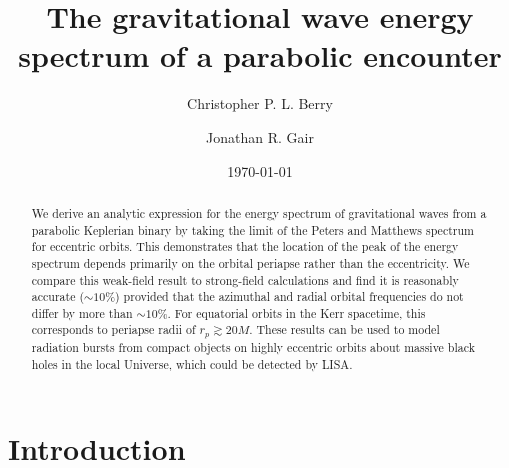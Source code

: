 \documentclass[aps,prd,amsfonts,amssymb,amsmath,nofootinbib,floatfix,reprint,showpacs,groupedaddress]{revtex4-1}
\begin{document}

\title{The gravitational wave energy spectrum of a parabolic encounter}

\author{Christopher P. L. Berry}
\author{Jonathan R. Gair}

\date{\today}

\begin{abstract}
We derive an analytic expression for the energy spectrum  of gravitational waves from a parabolic Keplerian binary by taking the limit of the Peters and Matthews spectrum for eccentric orbits. This demonstrates that the location of the peak of the energy spectrum depends primarily on the orbital periapse rather than the eccentricity. We compare this weak-field result to strong-field calculations and find it is reasonably accurate ($\sim10\%$) provided that the azimuthal and radial orbital frequencies do not differ by more than $\sim10\%$. For equatorial orbits in the Kerr spacetime, this corresponds to periapse radii of $r_{p} \gtrsim 20 M$. These results can be used to model radiation bursts from compact objects on highly eccentric orbits about massive black holes in the local Universe, which could be detected by LISA.
\end{abstract}


\maketitle

\section{Introduction}
\end{document}

